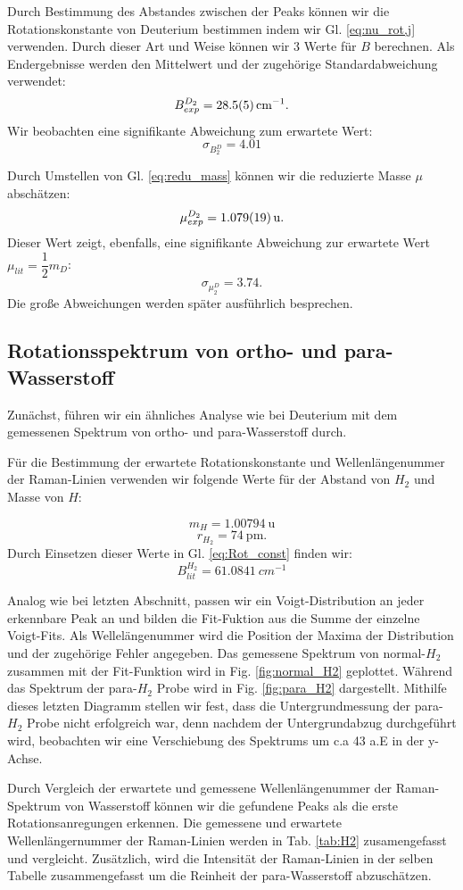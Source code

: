 \documentclass[11 pt]{article}
\begin{document}
Durch Bestimmung des Abstandes zwischen der Peaks können wir die Rotationskonstante von Deuterium bestimmen indem wir Gl. \ref{eq:nu_rot,j} verwenden. Durch dieser Art und Weise können wir 3 Werte für $B$ berechnen. Als Endergebnisse werden den Mittelwert und der zugehörige  Standardabweichung verwendet: 
$$B_{exp}^{D_2} = \SI{28.5\pm 0.5}{cm^{-1}}.$$
Wir beobachten eine signifikante Abweichung zum erwartete Wert:
$$\sigma_{B^D_2} = 4.01$$ 
 
Durch Umstellen von Gl. \ref{eq:redu_mass} können wir die reduzierte Masse $\mu$ abschätzen:
$$\mu_{exp}^{D_2} = \SI{1.079\pm 0.019}{\atomicmassunit}.$$
Dieser Wert zeigt, ebenfalls, eine signifikante Abweichung zur erwartete Wert $\mu_{lit} = \dfrac{1}{2}m_D$:
$$\sigma_{\mu^D_2} = 3.74.$$
Die große Abweichungen werden später ausführlich besprechen. 

\subsection{Rotationsspektrum von ortho- und para-Wasserstoff}
Zunächst, führen wir ein ähnliches Analyse wie bei Deuterium mit dem gemessenen Spektrum von ortho- und para-Wasserstoff durch.

Für die Bestimmung der erwartete Rotationskonstante und Wellenlängenummer der Raman-Linien verwenden wir folgende Werte für der Abstand von $H_2$ und Masse von $H$:

$$m_{H} =\SI{1.00794}{\atomicmassunit}$$
$$r_{H_2} = \SI{74}{\pm}.$$
Durch Einsetzen dieser Werte in Gl. \ref{eq:Rot_const} finden wir:
$$B_{lit}^{H_2} = \SI{61.0841}{cm^{-1}} $$

Analog wie bei letzten Abschnitt, passen wir ein Voigt-Distribution an jeder erkennbare Peak an und bilden die Fit-Fuktion aus die Summe der einzelne Voigt-Fits. Als Wellelängenummer wird die Position der Maxima der Distribution und der zugehörige Fehler angegeben. Das gemessene Spektrum von normal-$H_2$ zusammen mit der Fit-Funktion wird in Fig. \ref{fig:normal_H2} geplottet. Während das Spektrum der para-$H_2$ Probe wird in Fig. \ref{fig:para_H2} dargestellt. Mithilfe dieses letzten Diagramm stellen wir fest, dass die Untergrundmessung der para-$H_2$ Probe nicht erfolgreich war, denn nachdem der Untergrundabzug durchgeführt wird, beobachten wir eine Verschiebung des Spektrums um c.a 43 a.E in der y-Achse. 

Durch Vergleich der erwartete und gemessene Wellenlängenummer der Raman-Spektrum von Wasserstoff können wir die gefundene Peaks als die erste Rotationsanregungen erkennen. Die gemessene und erwartete Wellenlängernummer der Raman-Linien werden in Tab. \ref{tab:H2} zusamengefasst und vergleicht. Zusätzlich, wird die Intensität der Raman-Linien in der selben Tabelle zusammengefasst um die Reinheit der para-Wasserstoff abzuschätzen. 
\end{document}
